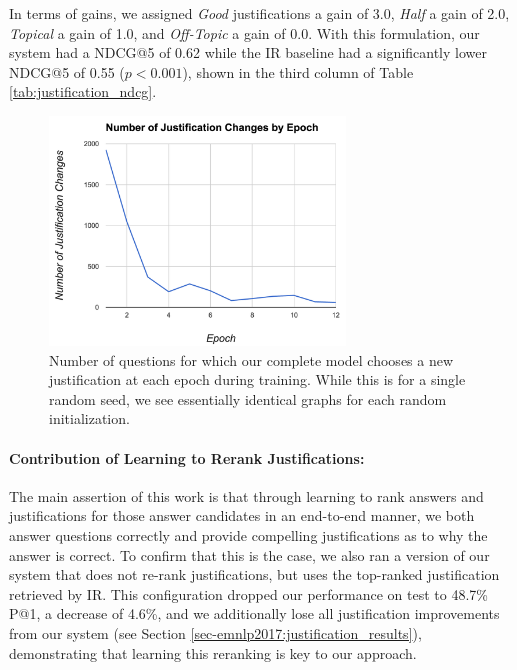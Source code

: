 In terms of gains, we assigned \emph{Good} justifications a gain of 3.0, \emph{Half} a gain of 2.0, \emph{Topical} a gain of 1.0, and \emph{Off-Topic} a gain of 0.0.  With this formulation, our system had a NDCG@5 of 0.62 while the IR baseline had a significantly lower NDCG@5 of 0.55 ($p < 0.001$), shown in the third column of Table \ref{tab:justification_ndcg}. 

\begin{figure}[t]
\begin{center}
\includegraphics[width=0.7\textwidth]{mainmatter/emnlp2017-qaj/justificationChanges.png}
\caption{Number of questions for which %
our complete model chooses a new justification at each epoch during training.  While this is for a single random seed, we see essentially identical graphs for each random initialization.}
\label{fig:changes}
\end{center}
\end{figure}

\paragraph{Contribution of Learning to Rerank Justifications:}
The main assertion of this work is that through learning to rank answers and justifications for those answer candidates in an end-to-end manner, we both answer questions correctly and provide compelling justifications as to why the answer is correct.  To confirm that this is the case, we also ran a version of our system that does not re-rank justifications, but uses the top-ranked justification retrieved by IR.  This configuration dropped our performance on test to 48.7\% P@1, a decrease of 4.6\%, and we additionally lose all justification improvements from our system (see Section \ref{sec-emnlp2017:justification_results}), demonstrating that learning this reranking is key to our approach.

